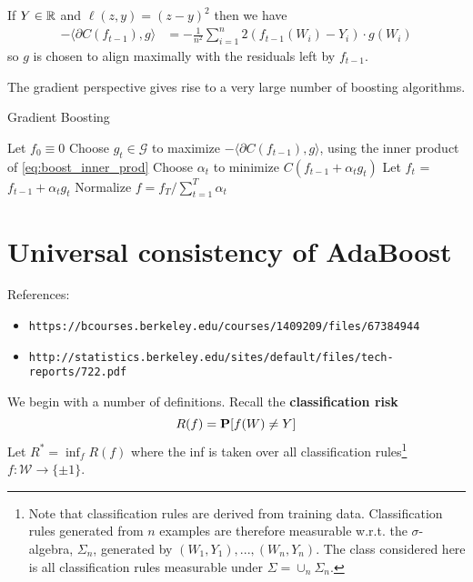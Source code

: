If $Y \in \mathbb{R}$ and $\ell(z, y) = (z - y)^2$ then we have
\begin{align*}
	-\langle \partial C(f_{t-1}), g \rangle &= -\frac{1}{n^2}\sum_{i=1}^n 2(f_{t-1}(W_i) - Y_i) \cdot g(W_i)
\end{align*}
so $g$ is chosen to align maximally with the residuals left by $f_{t-1}$.

The gradient perspective gives rise to a very large number of boosting algorithms.

\begin{algorithm}
\caption{Gradient Boosting}
   \begin{algorithmic}[1] \label{alg:gradient_boosting}
   \STATE Let $f_0 \equiv 0$
   	\STATE Choose $g_t \in \mathcal{G}$ to maximize $-\langle \partial C(f_{t-1}), g \rangle$, using the inner product of \eqref{eq:boost_inner_prod}
   	\STATE Choose $\alpha_t$ to minimize $C(f_{t-1} + \alpha_t g_t)$
    \STATE Let $f_t$ = $f_{t-1} + \alpha_t g_t$
   \ENDFOR  
   \STATE Normalize $f = f_T/\sum_{t=1}^T \alpha_t$
\end{algorithmic}
\end{algorithm}





\section{Universal consistency of AdaBoost}

References: 
\begin{itemize}
\item \verb|https://bcourses.berkeley.edu/courses/1409209/files/67384944|
\item \verb|http://statistics.berkeley.edu/sites/default/files/tech-reports/722.pdf|
\end{itemize}

We begin with a number of definitions. Recall the \textbf{classification risk}
\begin{equation*}
	R(f) = \mathbf{P} [f(W) \ne Y]
\end{equation*}
Let $R^* = \inf_f R(f)$ where the inf is taken over all classification rules\footnote{Note that classification rules are derived from training data. Classification rules generated from $n$ examples are therefore measurable w.r.t. the $\sigma$-algebra, $\Sigma_n$, generated by $(W_1, Y_1), ..., (W_n, Y_n)$. The class considered here is all classification rules measurable under $\Sigma = \cup_n \Sigma_n$.} $f:\mathcal{W} \to \{\pm 1\}$.

